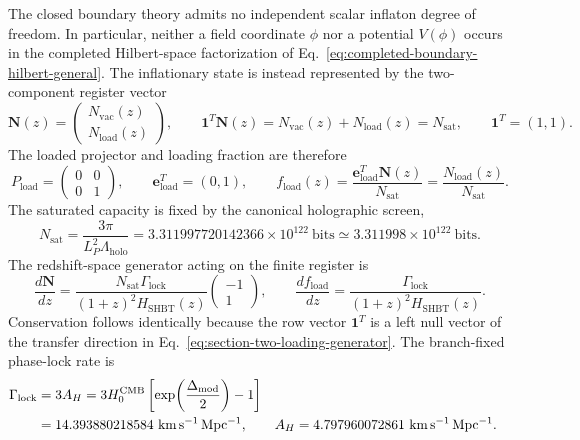 \documentclass[11pt,letterpaper]{article}
\theoremstyle{plain}
\newcommand{\Lholo}{\Lambda_{\text{holo}}}
\newcommand{\Nsat}{N_{\text{sat}}}
\newcommand{\Lp}{L_P}
\newcommand{\hcmb}{H_0^{\text{CMB}}}
\newcommand{\kmsmpc}{\mathrm{km\,s^{-1}\,Mpc^{-1}}}
\newcommand{\DeltaMod}{\Delta_{\text{mod}}}
\newcommand{\fload}{f_{\text{load}}}
\newcommand{\GammaLock}{\Gamma_{\text{lock}}}
\newcommand{\AH}{A_H}
\begin{document}
The closed boundary theory admits no independent scalar inflaton degree of
freedom.  In particular, neither a field coordinate $\phi$ nor a potential
$V(\phi)$ occurs in the completed Hilbert-space factorization of
Eq.~\eqref{eq:completed-boundary-hilbert-general}.  The inflationary state is
instead represented by the two-component register vector
\begin{equation}
\label{eq:section-two-loading-vector}
 \mathbf N(z)
 =
 \begin{pmatrix}
  N_{\mathrm{vac}}(z)\\
  N_{\mathrm{load}}(z)
 \end{pmatrix},
 \qquad
 \mathbf 1^{T}\mathbf N(z)
 =N_{\mathrm{vac}}(z)+N_{\mathrm{load}}(z)
 =\Nsat,
 \qquad
 \mathbf 1^{T}=(1,1).
\end{equation}
The loaded projector and loading fraction are therefore
\begin{equation}
\label{eq:section-two-loading-projector}
 P_{\mathrm{load}}
 =
 \begin{pmatrix}
  0&0\\
  0&1
 \end{pmatrix},
 \qquad
 \mathbf e_{\mathrm{load}}^{T}=(0,1),
 \qquad
 \fload(z)
 =
 \frac{\mathbf e_{\mathrm{load}}^{T}\mathbf N(z)}{\Nsat}
 =
 \frac{N_{\mathrm{load}}(z)}{\Nsat}.
\end{equation}
The saturated capacity is fixed by the canonical holographic screen,
\begin{equation}
\label{eq:section-two-saturated-register}
 \Nsat
 =
 \frac{3\pi}{\Lp^2\Lholo}
 =
 3.311997720142366\times10^{122}\ \mathrm{bits}
 \simeq
 3.311998\times10^{122}\ \mathrm{bits}.
\end{equation}
The redshift-space generator acting on the finite register is
\begin{equation}
\label{eq:section-two-loading-generator}
 \frac{d\mathbf N}{dz}
 =
 \frac{\Nsat\GammaLock}{(1+z)^2H_{\mathrm{SHBT}}(z)}
 \begin{pmatrix}
  -1\\
  1
 \end{pmatrix},
 \qquad
 \frac{d\fload}{dz}
 =
 \frac{\GammaLock}{(1+z)^2H_{\mathrm{SHBT}}(z)}.
\end{equation}
Conservation follows identically because the row vector $\mathbf 1^T$ is a
left null vector of the transfer direction in
Eq.~\eqref{eq:section-two-loading-generator}.  The branch-fixed phase-lock
rate is
\begin{align}
\label{eq:section-two-lock-rate}
 \GammaLock
 &=3\AH
 =3\hcmb\left[\exp\!\left(\frac{\DeltaMod}{2}\right)-1\right]
 \notag\\
 &=14.393880218584\ \kmsmpc,
 &
 \AH&=4.797960072861\ \kmsmpc.
\end{align}
\end{document}

